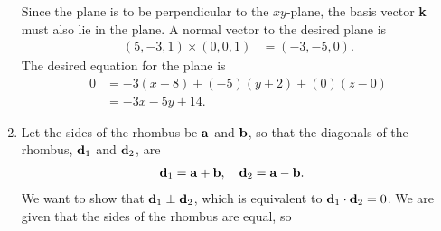 \documentclass{article}
\begin{document}
\begin{enumerate}
Since the plane is to be perpendicular to the $xy$-plane, the basis vector \textbf{k} must also lie in the plane. A normal vector to the desired plane is
\begin{align*}
(5,-3,1) \times (0,0,1) &= (-3,-5,0).
\end{align*}
The desired equation for the plane is
\begin{align*}
0&=-3(x-8)+(-5)(y+2)+(0)(z-0)\\
&=-3x -5y +14.
\end{align*}
\item %
Let the sides of the rhombus be $\mathbf{a}$ and $\mathbf{b}$, so that the diagonals of the rhombus, $\mathbf{d}_1$ and $\mathbf{d}_2$, are
\begin{align*}
  \mathbf{d}_1 &= \mathbf{a} + \mathbf{b}, \quad   \mathbf{d}_2 = \mathbf{a} - \mathbf{b} .
\end{align*}
We want to show that $\mathbf{d}_1 \perp \mathbf{d}_2$, which is equivalent to $\mathbf{d}_1 \cdot \mathbf{d}_2=0$. We are given that the sides of the rhombus are equal, so 

\end{enumerate}
\end{document}
